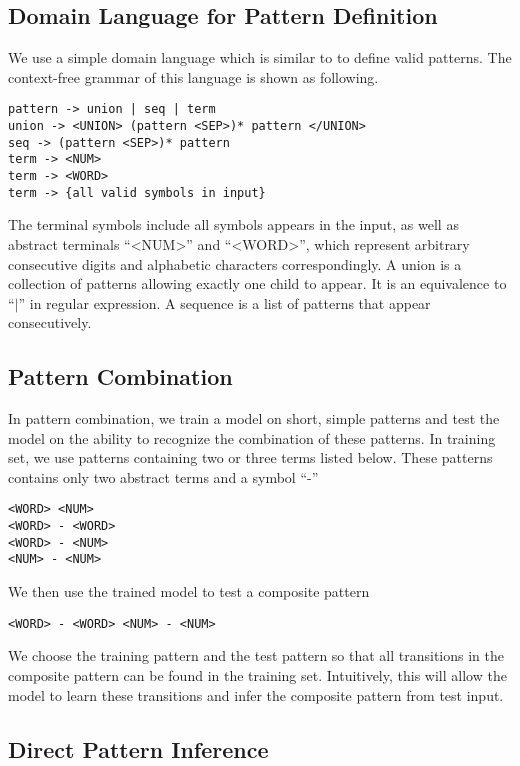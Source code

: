 \documentclass{article}
\begin{document}
\subsection{Domain Language for Pattern Definition}  
We use a simple domain language which is similar to \cite{dirt_2008}  to define valid patterns. The context-free grammar of this language is shown as following.
\begin{lstlisting}
pattern -> union | seq | term
union -> <UNION> (pattern <SEP>)* pattern </UNION>
seq -> (pattern <SEP>)* pattern
term -> <NUM>
term -> <WORD>
term -> {all valid symbols in input}
\end{lstlisting}
The terminal symbols include all symbols appears in the input, as well as abstract terminals ``\textless NUM\textgreater'' and ``\textless WORD\textgreater'', which represent arbitrary consecutive digits and alphabetic characters correspondingly. A union is a collection of patterns allowing exactly one child to appear. It is an equivalence to ``$\vert$'' in regular expression. A sequence is a list of patterns that appear consecutively.

\subsection{Pattern Combination}\label{sec:combo}

In pattern combination, we train a model on short, simple patterns and test the model on the ability to recognize the combination of these patterns. In training set, we use patterns containing two or three terms listed below. These patterns contains only two abstract terms and a symbol ``-''
\begin{lstlisting}
<WORD> <NUM>
<WORD> - <WORD>
<WORD> - <NUM>
<NUM> - <NUM> 
\end{lstlisting}

We then use the trained model to test a composite pattern 
\begin{lstlisting}
<WORD> - <WORD> <NUM> - <NUM>
\end{lstlisting}
We choose the training pattern and the test pattern so that all transitions in the composite pattern can be found in the training set. Intuitively, this will allow the model to learn these transitions and infer the composite pattern from test input.

\subsection{Direct Pattern Inference}\label{sec:pattern}
\end{document}

